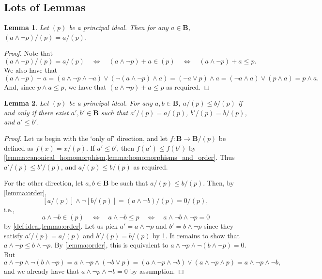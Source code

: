 \documentclass{article}
\newtheorem{lemma}{Lemma}
\theoremstyle{definition}
\theoremstyle{remark}
\begin{document}
\subsection{Lots of Lemmas}

\begin{lemma} \label{lemma:elements_in_quotients}
  Let $(p)$ be a principal ideal. Then for any $a \in \mathbf{B}$, $(a \land
  \neg p)/(p) = a/(p)$.
\end{lemma}
\begin{proof}
  Note that
  \[
    (a \land \neg p)/(p) = a/(p) \quad \iff \quad (a \land \neg p) + a \in (p)
    \quad \iff \quad (a \land \neg p) + a \le p.
  \]
  We also have that
  \[
    (a \land \neg p) + a = (a \land \neg p \land \neg a) \lor (\neg(a \land \neg
    p) \land a) = (\neg a \lor p) \land a = (\neg a \land a) \lor (p \land a) =
    p \land a.
  \]
  And, since $p \land a \le p$, we have that $(a \land \neg p) + a \le p$ as
  required.
\end{proof} %

\begin{lemma}
  Let $(p)$ be a principal ideal. For any $a, b \in \mathbf{B}$, $a/(p) \le
  b/(p)$ if and only if there exist $a', b' \in \mathbf{B}$ such that $a'/(p) =
  a/(p)$, $b'/(p) = b/(p)$, and $a' \le b'$.
\end{lemma}
\begin{proof}
  Let us begin with the `only of' direction, and let $f\colon \mathbf{B} \to
  \mathbf{B}/(p)$ be defined as $f(x) = x/(p)$. If $a' \le b'$, then $f(a') \le
  f(b')$ by \cref{lemma:canonical_homomorphism,lemma:homomorphisms_and_order}.
  Thus $a'/(p) \le b'/(p)$, and $a/(p) \le b/(p)$ as required.

  For the other direction, let $a, b \in \mathbf{B}$ be such that $a/(p) \le
  b/(p)$. Then, by \cref{lemma:order},
  \[
    [a/(p)] \land \neg [b/(p)] = (a \land \neg b)/(p) = 0/(p),
  \]
  i.e.,
  \[
    a \land \neg b \in (p) \quad \iff \quad a \land \neg b \le p \quad \iff
    \quad a \land \neg b \land \neg p = 0
  \]
  by \cref{def:ideal,lemma:order}. Let us pick $a' = a \land \neg p$ and $b' = b
  \land \neg p$ since they satisfy $a'/(p) = a/(p)$ and $b'/(p) = b/(p)$ by
  \cref{lemma:elements_in_quotients}. It remains to show that $a \land \neg p
  \le b \land \neg p$. By \cref{lemma:order}, this is equivalent to $a \land
  \neg p \land \neg(b \land \neg p) = 0$. But
  \[
    a \land \neg p \land \neg(b \land \neg p) = a \land \neg p \land (\neg b
    \lor p) = (a \land \neg p \land \neg b) \lor (a \land \neg p \land p) = a
    \land \neg p \land \neg b,
  \]
  and we already have that $a \land \neg p \land \neg b = 0$ by assumption.
\end{proof}
\end{document}
